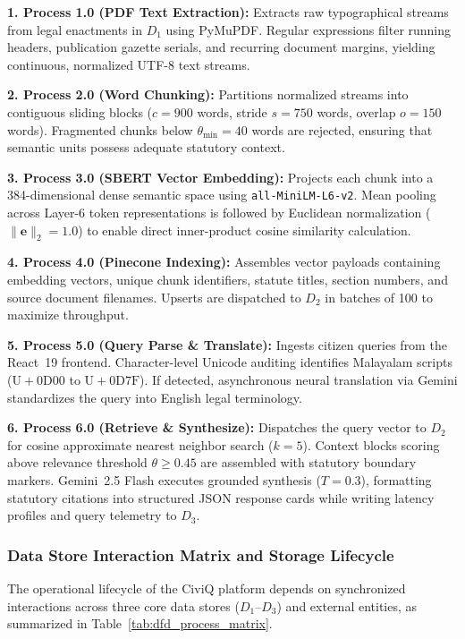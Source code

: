 \documentclass[12pt,a4paper]{report}
\begin{document}
\noindent\textbf{1. Process 1.0 (PDF Text Extraction):} Extracts raw typographical streams from legal enactments in $D_1$ using PyMuPDF. Regular expressions filter running headers, publication gazette serials, and recurring document margins, yielding continuous, normalized UTF-8 text streams.\par\vspace{2pt}
\noindent\textbf{2. Process 2.0 (Word Chunking):} Partitions normalized streams into contiguous sliding blocks ($c=900$ words, stride $s=750$ words, overlap $o=150$ words). Fragmented chunks below $\theta_{\min}=40$ words are rejected, ensuring that semantic units possess adequate statutory context.\par\vspace{2pt}
\noindent\textbf{3. Process 3.0 (SBERT Vector Embedding):} Projects each chunk into a 384-dimensional dense semantic space using \texttt{all-MiniLM-L6-v2}. Mean pooling across Layer-6 token representations is followed by Euclidean normalization ($\|\mathbf{e}\|_2 = 1.0$) to enable direct inner-product cosine similarity calculation.\par\vspace{2pt}
\noindent\textbf{4. Process 4.0 (Pinecone Indexing):} Assembles vector payloads containing embedding vectors, unique chunk identifiers, statute titles, section numbers, and source document filenames. Upserts are dispatched to $D_2$ in batches of 100 to maximize throughput.\par\vspace{2pt}
\noindent\textbf{5. Process 5.0 (Query Parse \& Translate):} Ingests citizen queries from the React~19 frontend. Character-level Unicode auditing identifies Malayalam scripts ($\mathrm{U{+}0D00}$ to $\mathrm{U{+}0D7F}$). If detected, asynchronous neural translation via Gemini standardizes the query into English legal terminology.\par\vspace{2pt}
\noindent\textbf{6. Process 6.0 (Retrieve \& Synthesize):} Dispatches the query vector to $D_2$ for cosine approximate nearest neighbor search ($k=5$). Context blocks scoring above relevance threshold $\theta \ge 0.45$ are assembled with statutory boundary markers. Gemini~2.5 Flash executes grounded synthesis ($T=0.3$), formatting statutory citations into structured JSON response cards while writing latency profiles and query telemetry to $D_3$.

\subsubsection{Data Store Interaction Matrix and Storage Lifecycle}
The operational lifecycle of the CiviQ platform depends on synchronized interactions across three core data stores ($D_1$--$D_3$) and external entities, as summarized in Table~\ref{tab:dfd_process_matrix}.
\end{document}
